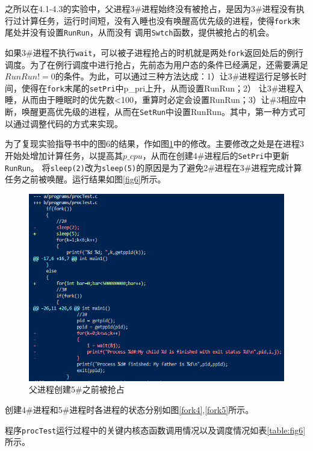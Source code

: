 之所以在4.1-4.3的实验中，父进程3\#进程始终没有被抢占，是因为3\#进程没有执行过计算任务，运行时间短，没有入睡也没有唤醒高优先级的进程，使得\texttt{fork}末尾处并没有设置\texttt{RunRun}，从而没有
调用\texttt{Swtch}函数，提供被抢占的机会。


如果3\#进程不执行\texttt{wait}，可以被子进程抢占的时机就是两处\texttt{fork}返回处后的例行调度。为了在例行调度中进行抢占，先前态为用户态的条件已经满足，还需要满足
$RunRun!=0$的条件。为此，可以通过三种方法达成：1）让3\#进程运行足够长时间，使得在\texttt{fork}末尾的\texttt{setPri}中p\_pri上升，从而设置RunRun；2）
让3\#进程入睡，从而由于睡眠时的优先数<100，重算时必定会设置RunRun；3）让\#3相应中断，唤醒更高优先级的进程，从而在\texttt{SetRun}中设置RunRun。其中，第一种方式可以通过调整代码的方式来实现。

为了复现实验指导书中的图6的结果，作如图\ref{fig6change}中的修改。主要修改之处是在进程3开始处增加计算任务，以提高其$p\_cpu$，从而在创建4\#进程后的\texttt{SetPri}中更新\texttt{RunRun}。
将\texttt{sleep(2)}改为\texttt{sleep(5)}的原因是为了避免2\#进程在3\#进程完成计算任务之前被唤醒。运行结果如图\ref{fig6}所示。

\begin{figure}[!htbp]
    \centering
    \includegraphics[width=\textwidth]{images/fig6change.png}
    \caption{父进程创建5\#之前被抢占}\label{fig6change}
\end{figure}

创建4\#进程和5\#进程时各进程的状态分别如图\ref{fork4},\ref{fork5}所示。

程序\texttt{procTest}运行过程中的关键内核态函数调用情况以及调度情况如表\ref{table:fig6}所示。

